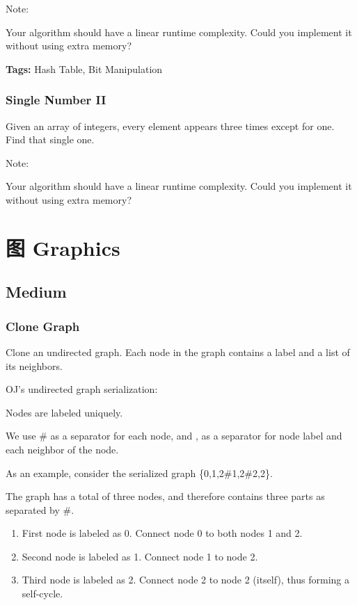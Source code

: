 \documentclass[12pt]{book}
\begin{document}
Note:

Your algorithm should have a linear runtime complexity. Could you implement it without using extra memory?

\textbf{Tags:} Hash Table, Bit Manipulation

\subsection{Single Number II}
\label{sec-17-2-3}
Given an array of integers, every element appears three times except for one. Find that single one.

Note:

Your algorithm should have a linear runtime complexity. Could you implement it without using extra memory?

\chapter{图 Graphics}
\label{sec-18}
\section{Medium}
\label{sec-18-1}
\subsection{Clone Graph}
\label{sec-18-1-1}
Clone an undirected graph. Each node in the graph contains a label and a list of its neighbors.

OJ's undirected graph serialization:

Nodes are labeled uniquely.

We use \# as a separator for each node, and , as a separator for node label and each neighbor of the node.

As an example, consider the serialized graph \{0,1,2\#1,2\#2,2\}.

The graph has a total of three nodes, and therefore contains three parts as separated by \#.

\begin{enumerate}
\item First node is labeled as 0. Connect node 0 to both nodes 1 and 2.
\item Second node is labeled as 1. Connect node 1 to node 2.
\item Third node is labeled as 2. Connect node 2 to node 2 (itself), thus forming a self-cycle.
\end{enumerate}
\end{document}
